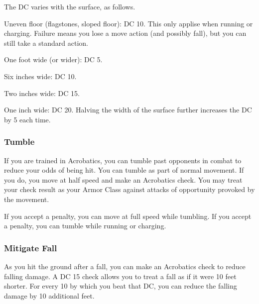 The DC varies with the surface, as follows.

\begin{itemize*}
  \item Uneven floor (flagstones, sloped floor): DC 10. This only applise when running or charging. Failure means you lose a move action (and possibly fall), but you can still take a standard action.
  \item One foot wide (or wider): DC 5. 
  \item Six inches wide: DC 10.
  \item Two inches wide: DC 15.
  \item One inch wide: DC 20. Halving the width of the surface further increases the DC by 5 each time.
\end{itemize*}

\subsubsection{Tumble}
If you are trained in Acrobatics, you can tumble past opponents in combat to reduce your odds of being hit. You can tumble as part of normal movement. If you do, you move at half speed and make an Acrobatics check. You may treat your check result as your Armor Class against attacks of opportunity provoked by the movement.

If you accept a  penalty, you can move at full speed while tumbling. If you accept a  penalty, you can tumble while running or charging.

\subsubsection{Mitigate Fall}
As you hit the ground after a fall, you can make an Acrobatics check to reduce falling damage. A DC 15 check allows you to treat a fall as if it were 10 feet shorter. For every 10 by which you beat that DC, you can reduce the falling damage by 10 additional feet.

